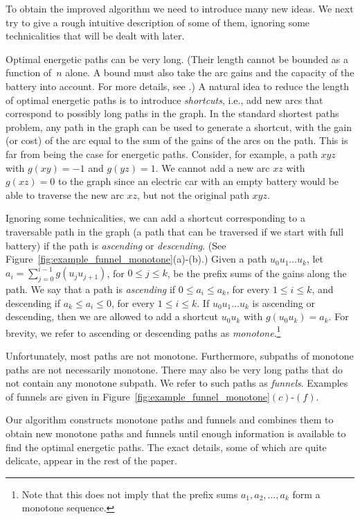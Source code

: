 \documentclass[11pt]{article}
\begin{document}
To obtain the improved algorithm we need to introduce many new ideas. We next try to give a rough intuitive description of some of them, ignoring some technicalities that will be dealt with later.

Optimal energetic paths can be very long. (Their length cannot be bounded as a function of~$n$ alone. A bound must also take the arc gains and the capacity of the battery into account. For more details, see \cite{DorfmanKTZ23}.) A natural idea to reduce the length of optimal energetic paths is to introduce \emph{shortcuts}, i.e., add new arcs that correspond to possibly long paths in the graph. In the standard shortest paths problem, any path in the graph can be used to generate a shortcut, with the gain (or cost) of the arc equal to the sum of the gains of the arcs on the path. This is far from being the case for energetic paths. Consider, for example, a path $xyz$ with $g(xy)=-1$ and $g(yz)=1$. We cannot add a new arc $xz$ with $g(xz)=0$ to the graph since an electric car with an empty battery would be able to traverse the new arc $xz$, but not the original path $xyz$.

Ignoring some technicalities, we can add a shortcut corresponding to a traversable path in the graph (a path that can be traversed if we start with full battery) if the path is \emph{ascending} or \emph{descending}. (See Figure~\ref{fig:example_funnel_monotone}(a)-(b).) Given a path $u_0u_1\ldots u_{k}$, let $a_i=\sum_{j=0}^{i-1} g(u_ju_{j+1})$, for $0\le j\le k$, be the prefix sums of the gains along the path. We say that a path is \emph{ascending} if $0\le a_i\le a_k$, for every $1\le i\le k$, and descending if $a_k\le a_i\le 0$, for every $1\le i\le k$. If $u_0u_1\ldots u_{k}$ is ascending or descending, then we are allowed to add a shortcut $u_0u_k$ with $g(u_0u_k)=a_k$. For brevity, we refer to ascending or descending paths as \emph{monotone}.\footnote{Note that this does not imply that the prefix sums $a_1,a_2,\ldots,a_k$ form a monotone sequence.}

Unfortunately, most paths are not monotone. Furthermore, subpaths of monotone paths are not necessarily monotone. 
There may also be very long paths that do not contain any monotone subpath. We refer to such paths as \emph{funnels}. Examples of funnels are given in Figure~\ref{fig:example_funnel_monotone}$(c)$-$(f)$.

Our algorithm constructs monotone paths and funnels and combines them to obtain new monotone paths and funnels until enough information is available to find the optimal energetic paths. The exact details, some of which are quite delicate, appear in the rest of the paper.
\end{document}
